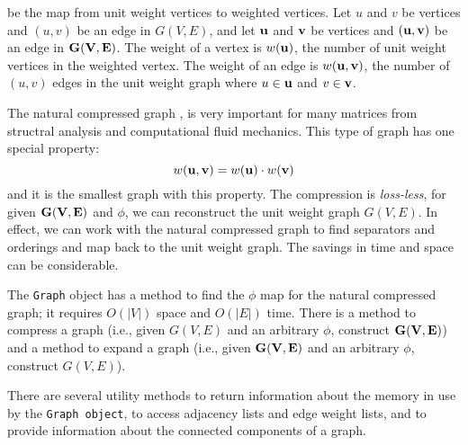 be the map from unit weight vertices to weighted vertices.
Let $u$ and $v$ be vertices and $(u,v)$ be an edge in $G(V,E)$,
and let ${\bf u}$ and ${\bf v}$ be vertices 
and $({\bf u},{\bf v})$ be an edge in ${\bf G}({\bf V}, {\bf E})$.
The weight of a vertex is $w({\bf u})$, the number of unit weight
vertices in the weighted vertex.
The weight of an edge is 
$w({\bf u},{\bf v})$, the number of $(u,v)$ edges in the 
unit weight graph where $u \in {\bf u}$ and $v \in {\bf v}$.
\par
The natural compressed graph \cite{ash95-compressed-graphs},
\cite{dam92-compressed} 
is very important for many matrices from structral
analysis and computational fluid mechanics.
This type of graph has one special property:
$$
w({\bf u}, {\bf v}) = w({\bf u}) \cdot w({\bf v})
$$
and it is the smallest graph with this property.
The compression is {\it loss-less}, 
for given ${\bf G}({\bf V},{\bf E})$ and $\phi$,
we can reconstruct the unit weight graph $G(V,E)$.
In effect, we can work with the natural compressed graph to find
separators and orderings and map back to the unit weight graph.
The savings in time and space can be considerable.
\par
The {\tt Graph} object has a method to find the $\phi$ map for the
natural compressed graph; it requires $O(|V|)$ space and $O(|E|)$
time.
There is a method to compress a graph 
(i.e., given $G(V,E)$ and an arbitrary $\phi$, 
construct ${\bf G}({\bf V}, {\bf E})$) 
and a method to expand a graph
(i.e., given ${\bf G}({\bf V},{\bf E})$ and an arbitrary $\phi$, 
construct $G(V, E)$).
\par
There are several utility methods to return information about the
memory in use by the {\tt Graph object}, to access adjacency lists
and edge weight lists, and to provide information about the
connected components of a graph. 
